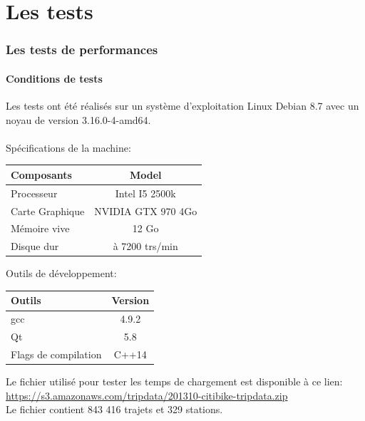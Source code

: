 \documentclass[12pt]{article}
\begin{document}
\part{Les tests}

	\section{Les tests de performances}
		\subsection{Conditions de tests}
		Les tests ont été réalisés sur un système d’exploitation Linux Debian 8.7 avec
		un noyau de version 3.16.0-4-amd64. \\ \\
		Spécifications de la machine: \\
		\begin{center}
			\begin{tabular}{| l | c |}
			\hline
			\textbf{Composants} & \textbf{Model} \\ \hline
			Processeur & Intel I5 2500k \\ \hline
			Carte Graphique & NVIDIA GTX 970 4Go \\ \hline
			Mémoire vive & 12 Go \\ \hline
			Disque dur & à 7200 trs/min \\ \hline
		    \end{tabular}
	    \end{center}
	    
	    Outils de développement: \\
	    \begin{center}
			\begin{tabular}{| l | c |}
			\hline
			\textbf{Outils} & \textbf{Version} \\ \hline
			gcc & 4.9.2 \\ \hline
			Qt & 5.8 \\ \hline
			Flags de compilation & C++14\\ \hline
		    \end{tabular}
	    \end{center}
	    
	    Le fichier utilisé pour tester les temps de chargement est disponible à ce lien:\\
		\url{https://s3.amazonaws.com/tripdata/201310-citibike-tripdata.zip}\\
		
		Le fichier contient 843 416 trajets et 329 stations.
	    
\end{document}
